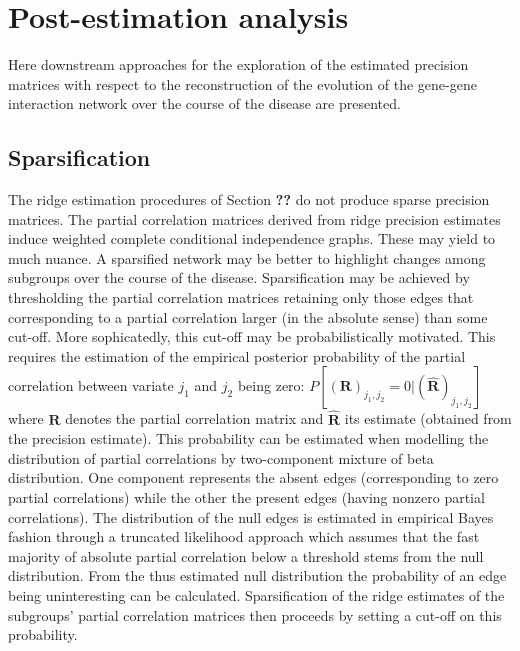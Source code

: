 \documentclass[10pt]{article}
\begin{document}
\section{Post-estimation analysis}\label{postestimation}
Here downstream approaches for the exploration of the estimated precision matrices with respect
to the reconstruction of the evolution of the gene-gene interaction network over the course of the
disease are presented.

\subsection{Sparsification}\label{sparsify}
The ridge estimation procedures of Section \textbf{??} do not produce sparse precision matrices. The partial correlation matrices derived from ridge precision estimates induce weighted complete conditional independence graphs. These may yield to much nuance. A sparsified network may be better to highlight changes among subgroups over the course of the disease. Sparsification may be achieved by thresholding the partial correlation matrices retaining only those edges that corresponding to a partial correlation larger (in the absolute sense) than some cut-off. More sophicatedly, this cut-off may be probabilistically motivated. This requires the estimation of the empirical posterior probability of the partial correlation between variate $j_1$ and $j_2$ being zero: $P[(\mathbf{R})_{j_1,j_2} = 0| (\widehat{\mathbf{R}})_{j_1,j_2} ]$ where $\mathbf{R}$ denotes the partial correlation matrix and $\widehat{\mathbf{R}}$ its estimate (obtained from the precision estimate). This probability can be estimated when modelling the distribution of partial correlations by two-component mixture of beta distribution. One component represents the absent edges (corresponding to zero partial correlations) while the other the present edges (having nonzero partial correlations). The distribution of the null edges is estimated in empirical Bayes fashion through a truncated likelihood approach which assumes that the fast majority of absolute partial correlation below a threshold stems from the null distribution. From the thus estimated null distribution the
probability of an edge being uninteresting can be calculated. Sparsification of the ridge estimates of the subgroups' partial correlation matrices then proceeds by setting a cut-off on this probability.
\end{document}
